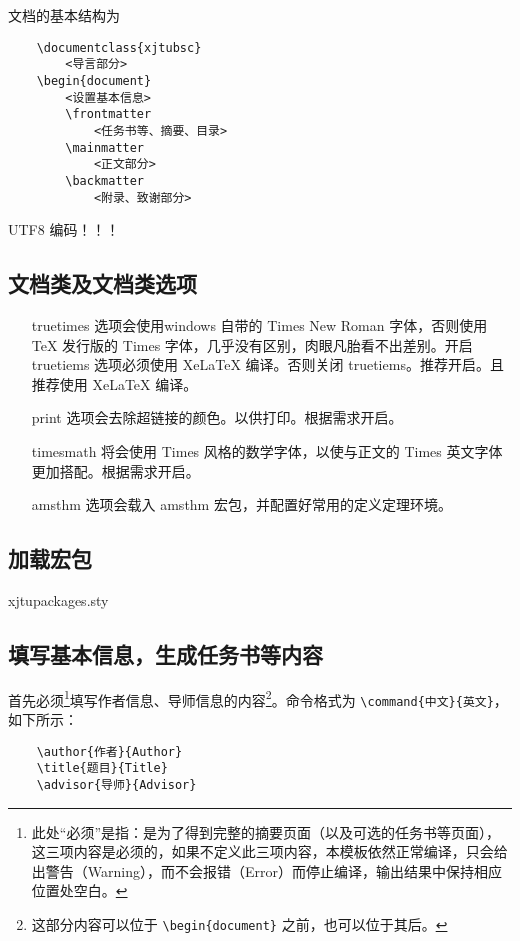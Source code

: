 \documentclass[%
               amsthm,
              ]{xjtubsc}
\begin{document}
文档的基本结构为
\begin{verbatim}
    \documentclass{xjtubsc}
        <导言部分>
    \begin{document}
        <设置基本信息>
        \frontmatter  
            <任务书等、摘要、目录>
        \mainmatter
            <正文部分>
        \backmatter
            <附录、致谢部分>
\end{verbatim}

UTF8 编码！！！
\subsection{文档类及文档类选项}

\begin{itemize}
\item[truetimes] 选项会使用windows 自带的 Times New Roman 字体，否则使用 TeX 发行版的 Times 字体，几乎没有区别，肉眼凡胎看不出差别。开启 truetiems 选项必须使用 XeLaTeX 编译。否则关闭 truetiems。推荐开启。且推荐使用 XeLaTeX 编译。

\item[print] 选项会去除超链接的颜色。以供打印。根据需求开启。

\item[timesmath] 将会使用 Times 风格的数学字体，以使与正文的 Times 英文字体更加搭配。根据需求开启。

\item[amsthm] 选项会载入 amsthm 宏包，并配置好常用的定义定理环境。
\end{itemize}

\subsection{加载宏包}
xjtupackages.sty

\subsection{填写基本信息，生成任务书等内容}

首先必须\footnote{此处“必须”是指：是为了得到完整的摘要页面（以及可选的任务书等页面），这三项内容是必须的，如果不定义此三项内容，本模板依然正常编译，只会给出警告（Warning），而不会报错（Error）而停止编译，输出结果中保持相应位置处空白。}填写作者信息、导师信息的内容\footnote{这部分内容可以位于 \verb+\begin{document}+ 之前，也可以位于其后。}。命令格式为 \verb|\command{中文}{英文}|，如下所示：
\begin{verbatim}
    \author{作者}{Author}
    \title{题目}{Title}
    \advisor{导师}{Advisor}
\end{verbatim}
\end{document}
